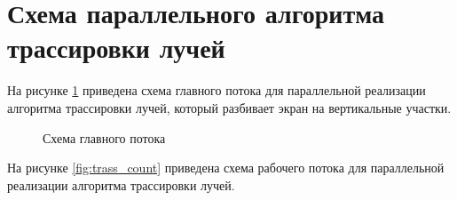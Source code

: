 \section{Схема параллельного алгоритма трассировки лучей}

На рисунке \ref{fig:trass_split} приведена схема главного потока для параллельной реализации алгоритма трассировки лучей, который разбивает экран на вертикальные участки.

\begin{figure}[h!]
	
	
	\caption{Схема главного потока}
	
	\label{fig:trass_split}
	
\end{figure}

На рисунке \ref{fig:trass_count} приведена схема рабочего потока для параллельной реализации алгоритма трассировки лучей.

